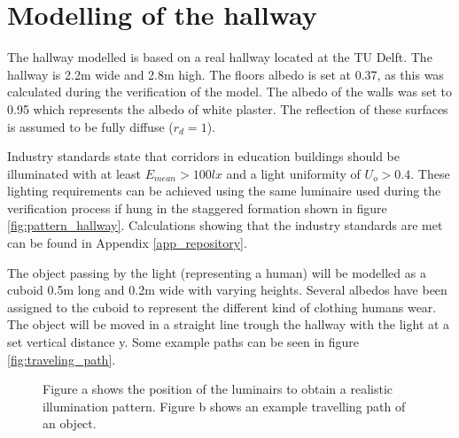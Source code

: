 \section{Modelling of the hallway}
\label{sec:moddelingofthehallway}
The hallway modelled is based on a real hallway located at the TU Delft. The hallway is 2.2m wide and 2.8m high. The floors albedo is set at 0.37, as this was calculated during the verification of the model. The albedo of the walls was set to 0.95 which represents the albedo of white plaster\cite{Albedo}. The reflection of these surfaces is assumed to be fully diffuse ($r_d = 1$).

Industry standards state that corridors in education buildings should be illuminated with at least $E_{mean} > 100lx$ and a light uniformity of $U_o > 0.4$\cite{lichthandbuch}. These lighting requirements can be achieved using the same luminaire used during the verification process if hung in the staggered formation shown in figure \ref{fig:pattern_hallway}. Calculations showing that the industry standards are met can be found in Appendix \ref{app_repository}.

The object passing by the light (representing a human) will be modelled as a cuboid 0.5m long and 0.2m wide with varying heights. Several albedos have been assigned to the cuboid to represent the different kind of clothing humans wear. The object will be moved in a straight line trough the hallway with the light at a set vertical distance y. Some example paths can be seen in figure \ref{fig:traveling_path}.

\begin{figure}
	\centering     %
	\caption{Figure a shows the position of the luminairs to obtain a realistic illumination pattern. Figure b shows an example travelling path of an object.}
\end{figure}

